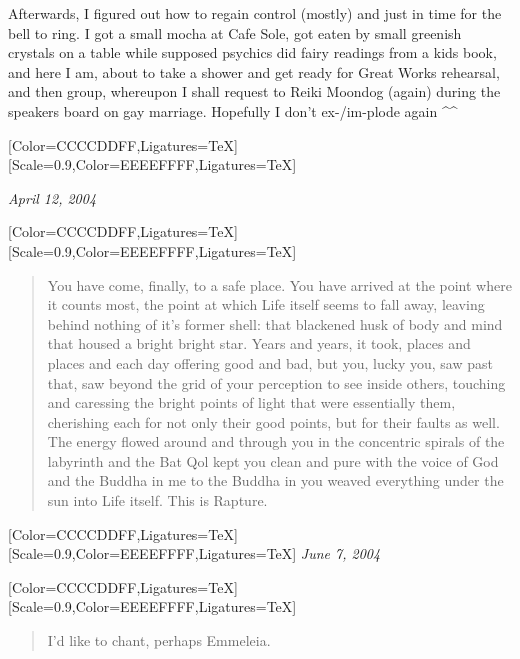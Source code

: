 \begin{paracol}{2}
\begin{leftcolumn}
Afterwards, I figured out how to regain control (mostly) and just in time for the bell to ring. I got a small mocha at Cafe Sole, got eaten by small greenish crystals on a table while supposed psychics did fairy readings from a kids book, and here I am, about to take a shower and get ready for Great Works rehearsal, and then group, whereupon I shall request to Reiki Moondog (again) during the speakers board on gay marriage. Hopefully I don't ex-/im-plode again \^{}\^{}
\newpage
\end{leftcolumn}
\begin{rightcolumn*}
  [Color=CCCCDDFF,Ligatures=TeX]
  \renewfontfamily{}[Scale=0.9,Color=EEEEFFFF,Ligatures=TeX]
\begin{flushright}
    \emph{April 12, 2004}
\end{flushright}
\end{rightcolumn*}
\begin{leftcolumn}
  [Color=CCCCDDFF,Ligatures=TeX]
  \renewfontfamily{}[Scale=0.9,Color=EEEEFFFF,Ligatures=TeX]
\begin{quotation}
\noindent You have come, finally, to a safe place. You have arrived at the point where it counts most, the point at which Life itself seems to fall away, leaving behind nothing of it's former shell: that blackened husk of body and mind that housed a bright bright star. Years and years, it took, places and places and each day offering good and bad, but you, lucky you, saw past that, saw beyond the grid of your perception to see inside others, touching and caressing the bright points of light that were essentially them, cherishing each for not only their good points, but for their faults as well. The energy flowed around and through you in the concentric spirals of the labyrinth and the Bat Qol kept you clean and pure with the voice of God and the Buddha in me to the Buddha in you weaved everything under the sun into Life itself. This is Rapture.
\end{quotation}
\newpage
\end{leftcolumn}
\begin{rightcolumn*}
  [Color=CCCCDDFF,Ligatures=TeX]
  \renewfontfamily{}[Scale=0.9,Color=EEEEFFFF,Ligatures=TeX]
    \emph{June 7, 2004}
\end{rightcolumn*}
\begin{leftcolumn}
  [Color=CCCCDDFF,Ligatures=TeX]
  \renewfontfamily{}[Scale=0.9,Color=EEEEFFFF,Ligatures=TeX]
\begin{quotation}
\noindent I'd like to chant, perhaps Emmeleia.


\end{quotation}
\end{leftcolumn}
\end{paracol}
